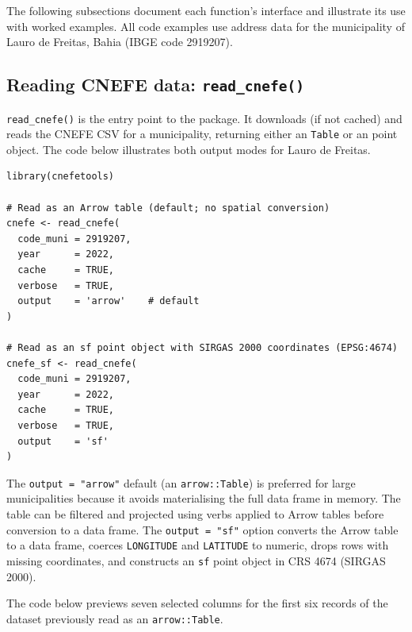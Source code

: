 The following subsections document each function's interface and
illustrate its use with worked examples. All code examples use address
data for the municipality of Lauro de Freitas, Bahia (IBGE code
2919207).

\subsection{\texorpdfstring{Reading CNEFE data: \texttt{read\_cnefe()}}{Reading CNEFE data: read\_cnefe()}}\label{reading-cnefe-data-read_cnefe}

\texttt{read\_cnefe()} is the entry point to the package. It downloads (if not
cached) and reads the CNEFE CSV for a municipality, returning either an
 \citep{arrow2026} \texttt{Table} or an  point object. The code below
illustrates both output modes for Lauro de Freitas.

\begin{verbatim}
library(cnefetools)

# Read as an Arrow table (default; no spatial conversion)
cnefe <- read_cnefe(
  code_muni = 2919207,
  year      = 2022,
  cache     = TRUE,
  verbose   = TRUE,
  output    = 'arrow'    # default
)

# Read as an sf point object with SIRGAS 2000 coordinates (EPSG:4674)
cnefe_sf <- read_cnefe(
  code_muni = 2919207,
  year      = 2022,
  cache     = TRUE,
  verbose   = TRUE,
  output    = 'sf'
) 
\end{verbatim}

The \texttt{output\ =\ "arrow"} default (an \texttt{arrow::Table}) is preferred for
large municipalities because it avoids materialising the full data frame
in memory. The table can be filtered and projected using 
verbs applied to Arrow tables before conversion to a data frame. The
\texttt{output\ =\ "sf"} option converts the Arrow table to a data frame, coerces
\texttt{LONGITUDE} and \texttt{LATITUDE} to numeric, drops rows with missing
coordinates, and constructs an \texttt{sf} point object in CRS 4674 (SIRGAS
2000).

The code below previews seven selected columns for the first six records
of the dataset previously read as an \texttt{arrow::Table}.

